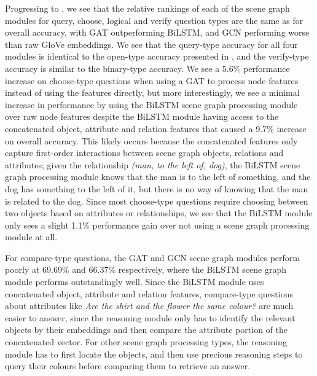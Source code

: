 Progressing to \tableautorefname{ \ref{table:scene_graph_ablation_structural}}, we see that the relative rankings of each of the scene graph modules for query, choose, logical and verify question types are the same as for overall accuracy, with GAT outperforming BiLSTM, and GCN performing worse than raw GloVe embeddings. We see that the query-type accuracy for all four modules is identical to the open-type accuracy presented in \tableautorefname{ \ref{table:scene_graph_ablation_main}}, and the verify-type accuracy is similar to the binary-type accuracy. We see a 5.6\% performance increase on choose-type questions when using a GAT to process node features instead of using the features directly, but more interestingly, we see a minimal increase in performance by using the BiLSTM scene graph processing module over raw node features despite the BiLSTM module having access to the concatenated object, attribute and relation features that caused a 9.7\% increase on overall accuracy. This likely occurs because the concatenated features only capture first-order interactions between scene graph objects, relations and attributes; given the relationship \textit{(man, to the left of, dog)}, the BiLSTM scene graph processing module knows that the man is to the left of something, and the dog has something to the left of it, but there is no way of knowing that the man is related to the dog. Since most choose-type questions require choosing between two objects based on attributes or relationships, we see that the BiLSTM module only sees a slight 1.1\% performance gain over not using a scene graph processing module at all.

For compare-type questions, the GAT and GCN scene graph modules perform poorly at 69.69\% and 66.37\% respectively, where the BiLSTM scene graph module performs outstandingly well. Since the BiLSTM module uses concatenated object, attribute and relation features, compare-type questions about attributes like \textit{Are the shirt and the flower the same colour?} are much easier to answer, since the reasoning module only has to identify the relevant objects by their embeddings and then compare the attribute portion of the concatenated vector. For other scene graph processing types, the reasoning module has to first locate the objects, and then use precious reasoning steps to query their colours before comparing them to retrieve an answer.

